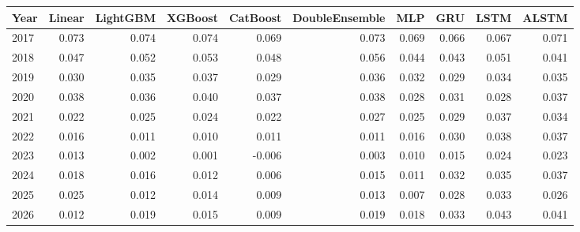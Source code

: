 \begin{tabular}{lrrrrrrrrr}
\toprule
Year & Linear & LightGBM & XGBoost & CatBoost & DoubleEnsemble & MLP & GRU & LSTM & ALSTM \\
\midrule
2017 & 0.073 & 0.074 & 0.074 & 0.069 & 0.073 & 0.069 & 0.066 & 0.067 & 0.071 \\
2018 & 0.047 & 0.052 & 0.053 & 0.048 & 0.056 & 0.044 & 0.043 & 0.051 & 0.041 \\
2019 & 0.030 & 0.035 & 0.037 & 0.029 & 0.036 & 0.032 & 0.029 & 0.034 & 0.035 \\
2020 & 0.038 & 0.036 & 0.040 & 0.037 & 0.038 & 0.028 & 0.031 & 0.028 & 0.037 \\
2021 & 0.022 & 0.025 & 0.024 & 0.022 & 0.027 & 0.025 & 0.029 & 0.037 & 0.034 \\
2022 & 0.016 & 0.011 & 0.010 & 0.011 & 0.011 & 0.016 & 0.030 & 0.038 & 0.037 \\
2023 & 0.013 & 0.002 & 0.001 & -0.006 & 0.003 & 0.010 & 0.015 & 0.024 & 0.023 \\
2024 & 0.018 & 0.016 & 0.012 & 0.006 & 0.015 & 0.011 & 0.032 & 0.035 & 0.037 \\
2025 & 0.025 & 0.012 & 0.014 & 0.009 & 0.013 & 0.007 & 0.028 & 0.033 & 0.026 \\
2026 & 0.012 & 0.019 & 0.015 & 0.009 & 0.019 & 0.018 & 0.033 & 0.043 & 0.041 \\
\bottomrule
\end{tabular}
